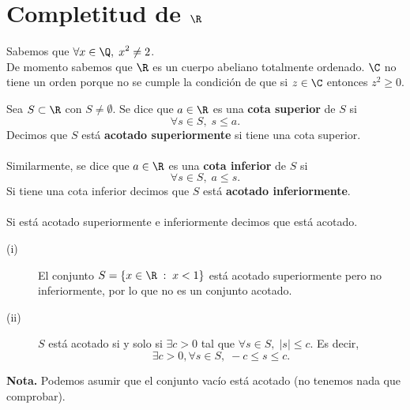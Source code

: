 \section{Completitud de $\displaystyle \R $ }

Sabemos que $\displaystyle \forall x\in \Q, \; x^{2} \neq 2 $. \\
De momento sabemos que $\displaystyle \R $ es un cuerpo abeliano totalmente ordenado. $\displaystyle \C $ no tiene un orden porque no se cumple la condición de que si $\displaystyle z \in \C $ entonces $\displaystyle z^{2}\geq0 $. 

\begin{fdefinition}[]
\normalfont Sea $\displaystyle S \subset \R $ con $\displaystyle S \neq \emptyset $. Se dice que $\displaystyle a \in \R$ es una \textbf{cota superior} de $\displaystyle S $ si 
\[\forall s \in S, \; s \leq a .\]
Decimos que $\displaystyle S $ está \textbf{acotado superiormente} si tiene una cota superior. \\ \\
Similarmente, se dice que $\displaystyle a \in \R $ es una \textbf{cota inferior} de $\displaystyle S $ si
\[\forall s \in S, \; a \leq s .\]
Si tiene una cota inferior decimos que $\displaystyle S $ está \textbf{acotado inferiormente}. \\ \\
Si está acotado superiormente e inferiormente decimos que está acotado.
\end{fdefinition}

\begin{eg}
\normalfont 
\begin{description}
\item[(i)] El conjunto $\displaystyle S = \left\{ x \in \R \; : \; x<1\right\}  $ está acotado superiormente pero no inferiormente, por lo que no es un conjunto acotado.
\item[(ii)] $\displaystyle S $ está acotado si y solo si $\displaystyle \exists c >0 $ tal que $\displaystyle \forall s \in S, \;\left|s\right| \leq c $. Es decir, 
	\[\exists c>0, \forall s \in S, \; -c \leq s \leq c .\]
\end{description}
\end{eg}

\textbf{Nota.} Podemos asumir que el conjunto vacío está acotado (no tenemos nada que comprobar).

